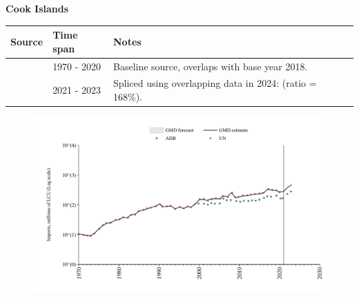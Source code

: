 \documentclass[12pt,a4paper,landscape]{article}
\begin{document}
\begin{adjustbox}{max totalsize={\paperwidth}{\paperheight},center}
\begin{minipage}[t][\textheight][t]{\textwidth}
\vspace*{0.5cm}
{}
\begin{center}
{\Large\bfseries Cook Islands}
\end{center}
\vspace{0.5cm}
\begin{table}[H]
\centering
\small
\begin{tabular}{|l|l|l|}
\hline
\textbf{Source} & \textbf{Time span} & \textbf{Notes} \\
\hline
\rowcolor{white}\cite{UN}& 1970 - 2020 &Baseline source, overlaps with base year 2018.\\
\rowcolor{lightgray}\cite{ADB}& 2021 - 2023 &Spliced using overlapping data in 2024: (ratio = 168\%).\\
\hline
\end{tabular}
\end{table}
\begin{figure}[H]
\centering
\includegraphics[width=\textwidth,height=0.6\textheight,keepaspectratio]{graphs/COK_imports.pdf}
\end{figure}
\end{minipage}
\end{adjustbox}
\end{document}
